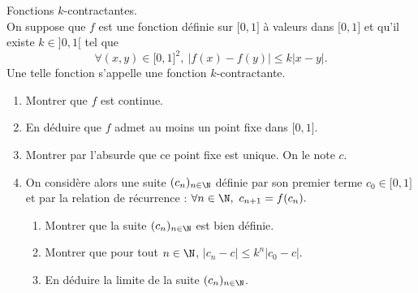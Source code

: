 \documentclass[a4paper, 11pt,reqno]{article}
\begin{document}
\begin{exercice}  \;
Fonctions $k$-contractantes.\\
\noindent On suppose que $f$ est une fonction d\'efinie sur $\lbrack 0,1\rbrack$ \`a valeurs dans $\lbrack 0,1\rbrack$ et qu'il existe $k\in\rbrack 0,1\lbrack$ tel que
$$\forall (x,y)\in\lbrack 0,1\rbrack^2,\ |f(x)-f(y)|\leq k|x-y|.$$
Une telle fonction s'appelle une fonction $k$-contractante.
\begin{enumerate}
\item Montrer que $f$ est continue. 
\item En déduire que $f$ admet au moins un point fixe dans $\lbrack 0,1\rbrack$. 
\item Montrer par l'absurde que ce point fixe est unique. On le note $c$.  

\item 
On consid\`ere alors une suite $(c_n)_{n\in\N}$ d\'efinie par son premier terme $c_0\in\lbrack 0,1\rbrack$ et par la relation de r\'ecurrence  : $\forall n\in\N,\ c_{n+1}=f(c_n).$
\begin{enumerate}
\item Montrer que la suite $(c_n)_{n\in\N}$ est bien d\'efinie.
\item Montrer que pour tout $n\in\N$, $|c_n-c|\leq k^n|c_0-c|$. 
\item En d\'eduire la limite de la suite $(c_n)_{n\in\N}$.
\end{enumerate}
\end{enumerate}
\end{exercice}
\end{document}
